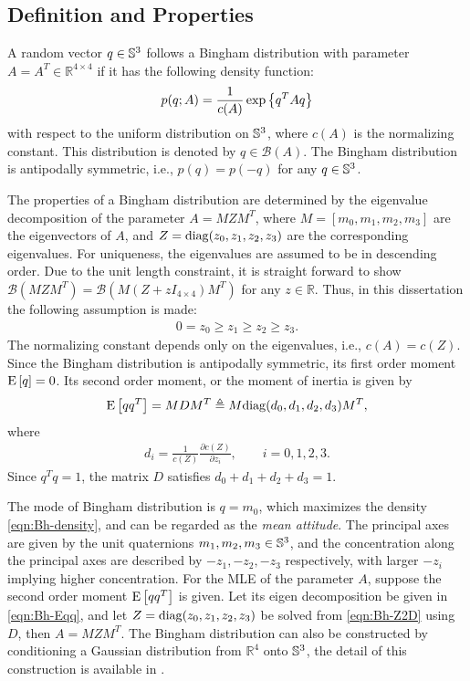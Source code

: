 \subsection{Definition and Properties}

A random vector $q\in\mathbb{S}^3$ follows a Bingham distribution with parameter $A = A^T\in\mathbb{R}^{4\times 4}$ if it has the following density function:
\begin{align} \label{eqn:Bh-density}
	p(q;A) = \frac{1}{c(A)} \exp\left\{ q^TAq \right\}
\end{align}
with respect to the uniform distribution on $\mathbb{S}^3$, where $c(A)$ is the normalizing constant.
This distribution is denoted by $q\in \mathcal{B}(A)$.
The Bingham distribution is antipodally symmetric, i.e., $p(q) = p(-q)$ for any $q\in\mathbb{S}^3$.

The properties of a Bingham distribution are determined by the eigenvalue decomposition of the parameter $A = MZM^T$, where $M = [m_0, m_1, m_2, m_3]$ are the eigenvectors of $A$, and $Z = \mathrm{diag}(z_0,z_1,z_2,z_3)$ are the corresponding eigenvalues.
For uniqueness, the eigenvalues are assumed to be in descending order.
Due to the unit length constraint, it is straight forward to show $\mathcal{B}\left(MZM^T\right) = \mathcal{B}\left(M(Z + zI_{4\times 4})M^T\right)$ for any $z\in\mathbb{R}$.
Thus, in this dissertation the following assumption is made: 
\begin{align}
	0 = z_0 \geq z_1 \geq z_2 \geq z_3.
\end{align}
The normalizing constant depends only on the eigenvalues, i.e., $c(A) = c(Z)$.
Since the Bingham distribution is antipodally symmetric, its first order moment $\mathrm{E}\left[ q \right] = 0$.
Its second order moment, or the moment of inertia is given by
\begin{align} \label{eqn:Bh-Eqq}
	\mathrm{E}\left[ qq^T \right] = MDM^T \triangleq M\mathrm{diag}(d_0,d_1,d_2,d_3)M^T,
\end{align}
where
\begin{align} \label{eqn:Bh-Z2D}
	d_i = \frac{1}{c(Z)} \frac{\partial c(Z)}{\partial z_i}, \qquad i = 0,1,2,3.
\end{align}
Since $q^Tq = 1$, the matrix $D$ satisfies $d_0+d_1+d_2+d_3 = 1$.

The mode of Bingham distribution is $q = m_0$, which maximizes the density \eqref{eqn:Bh-density}, and can be regarded as the \textit{mean attitude}.
The principal axes are given by the unit quaternions $m_1,m_2,m_3\in\mathbb{S}^3$, and the concentration along the principal axes are described by $-z_1,-z_2,-z_3$ respectively, with larger $-z_i$ implying higher concentration.
For the MLE of the parameter $A$, suppose the second order moment $\mathrm{E}\left[ qq^T \right]$ is given.
Let its eigen decomposition be given in \eqref{eqn:Bh-Eqq}, and let $Z = \mathrm{diag}(z_0,z_1,z_2,z_3)$ be solved from \eqref{eqn:Bh-Z2D} using $D$, then $A = MZM^T$.
The Bingham distribution can also be constructed by conditioning a Gaussian distribution from $\mathbb{R}^4$ onto $\mathbb{S}^3$, the detail of this construction is available in \cite{bingham1974antipodally}.

